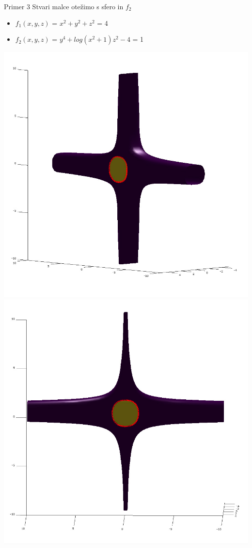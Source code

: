 \documentclass{beamer}
\begin{document}
	\begin{frame}{Primer 3}
		Stvari malce otežimo s sfero in $f_{2}$
		
		\begin{itemize}  
			\item $f_{1}(x,y,z)$ = $x^2 + y^2 + z^2$ = 4
			\item $f_{2}(x,y,z)$ = $y^4 + log(x^2 + 1)z^2 - 4$ = 1
		\end{itemize} 
		\includegraphics[scale=0.3]{primer3_1}
		\includegraphics[scale=0.3]{primer3_2}
	\end{frame}
\end{document}
